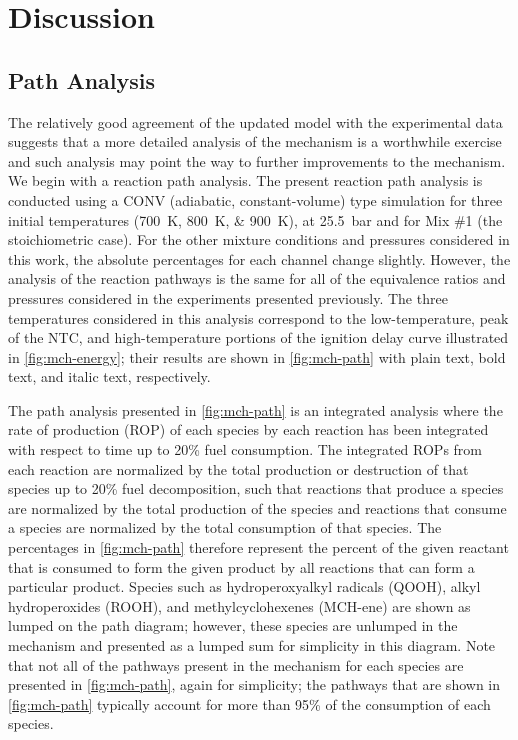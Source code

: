 \documentclass[12pt, letterpaper]{article}
\begin{document}
\section{Discussion}
\label{sec:discussion}
\subsection{Path Analysis}
\label{sec:mch-path-analysis}

The relatively good agreement of the updated model with the experimental data
suggests that a more detailed analysis of the mechanism is a worthwhile
exercise and such analysis may point the way to further improvements to the
mechanism. We begin with a reaction path analysis. The present reaction path
analysis is conducted using a CONV (adiabatic, constant-volume) type simulation
for three initial temperatures (\SIlist{700;800;900}{\kelvin}), at \SI{25.5}{\bar} and for
Mix \#1 (the stoichiometric case). For the other mixture conditions and
pressures considered in this work, the absolute percentages for each channel
change slightly. However, the analysis of the reaction pathways is the same for
all of the equivalence ratios and pressures considered in the experiments
presented previously. The three temperatures considered in this analysis
correspond to the low-temperature, peak of the NTC, and high-temperature
portions of the ignition delay curve illustrated in \autoref{fig:mch-energy};
their results are shown in \autoref{fig:mch-path} with plain text, bold text,
and italic text, respectively.

The path analysis presented in \autoref{fig:mch-path} is an integrated analysis
where the rate of production (ROP) of each species by each reaction has been
integrated with respect to time up to 20\% fuel consumption. The integrated
ROPs from each reaction are normalized by the total production or destruction
of that species up to 20\% fuel decomposition, such that reactions that produce
a species are normalized by the total production of the species and reactions
that consume a species are normalized by the total consumption of that species.
The percentages in \autoref{fig:mch-path} therefore represent the percent of the given
reactant that is consumed to form the given product by all reactions that can
form a particular product. Species such as hydroperoxyalkyl radicals (QOOH),
alkyl hydroperoxides (ROOH), and methylcyclohexenes (MCH-ene) are shown as
lumped on the path diagram; however, these species are unlumped in the
mechanism and presented as a lumped sum for simplicity in this diagram. Note
that not all of the pathways present in the mechanism for each species are
presented in \autoref{fig:mch-path}, again for simplicity; the pathways that are shown in
\autoref{fig:mch-path} typically account for more than 95\% of the consumption
of each species.
\end{document}
